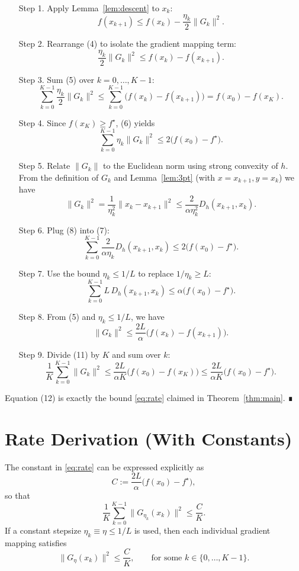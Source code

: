 \documentclass{article}
\newcommand{\Breg}[2]{D_h(#1,#2)}
\begin{document}
\begin{enumerate}
\item[Step 1.] Apply Lemma~\ref{lem:descent} to $x_k$:
\[
f(x_{k+1})\le f(x_k)-\frac{\eta_k}{2}\|G_k\|^{2}.
\tag{4}
\]
\item[Step 2.] Rearrange (4) to isolate the gradient mapping term:
\[
\frac{\eta_k}{2}\|G_k\|^{2}\le f(x_k)-f(x_{k+1}).
\tag{5}
\]
\item[Step 3.] Sum (5) over $k=0,\dots,K-1$:
\[
\sum_{k=0}^{K-1}\frac{\eta_k}{2}\|G_k\|^{2}
\le \sum_{k=0}^{K-1}\bigl(f(x_k)-f(x_{k+1})\bigr)
= f(x_0)-f(x_K).
\tag{6}
\]
\item[Step 4.] Since $f(x_K)\ge f^{\star}$, (6) yields
\[
\sum_{k=0}^{K-1}\eta_k\|G_k\|^{2}
\le 2\bigl(f(x_0)-f^{\star}\bigr).
\tag{7}
\]
\item[Step 5.] Relate $\|G_k\|$ to the Euclidean norm using strong convexity of $h$.
From the definition of $G_k$ and Lemma~\ref{lem:3pt} (with $x=x_{k+1},y=x_k$) we have
\[
\|G_k\|^{2}
= \frac{1}{\eta_k^{2}}\|x_k-x_{k+1}\|^{2}
\le \frac{2}{\alpha\eta_k^{2}}\Breg{x_{k+1}}{x_k}.
\tag{8}
\]
\item[Step 6.] Plug (8) into (7):
\[
\sum_{k=0}^{K-1}\frac{2}{\alpha\eta_k}\Breg{x_{k+1}}{x_k}
\le 2\bigl(f(x_0)-f^{\star}\bigr).
\tag{9}
\]
\item[Step 7.] Use the bound $\eta_k\le 1/L$ to replace $1/\eta_k\ge L$:
\[
\sum_{k=0}^{K-1}L\,\Breg{x_{k+1}}{x_k}
\le \alpha\bigl(f(x_0)-f^{\star}\bigr).
\tag{10}
\]
\item[Step 8.] From (5) and $\eta_k\le 1/L$, we have
\[
\|G_k\|^{2}\le \frac{2L}{\alpha}\bigl(f(x_k)-f(x_{k+1})\bigr).
\tag{11}
\]
\item[Step 9.] Divide (11) by $K$ and sum over $k$:
\[
\frac{1}{K}\sum_{k=0}^{K-1}\|G_k\|^{2}
\le \frac{2L}{\alpha K}\bigl(f(x_0)-f(x_K)\bigr)
\le \frac{2L}{\alpha K}\bigl(f(x_0)-f^{\star}\bigr).
\tag{12}
\]
\end{enumerate}
Equation (12) is exactly the bound \eqref{eq:rate} claimed in Theorem~\ref{thm:main}. ∎

\section*{Rate Derivation (With Constants)}
The constant in \eqref{eq:rate} can be expressed explicitly as
\[
C:=\frac{2L}{\alpha}\bigl(f(x_0)-f^{\star}\bigr),
\]
so that
\[
\frac{1}{K}\sum_{k=0}^{K-1}\|G_{\eta_k}(x_k)\|^{2}\le \frac{C}{K}.
\]
If a constant stepsize $\eta_k\equiv\eta\le 1/L$ is used, then each individual gradient mapping satisfies
\[
\|G_{\eta}(x_k)\|^{2}\le \frac{C}{K},\qquad \text{for some }k\in\{0,\dots,K-1\}.
\]
\end{document}
